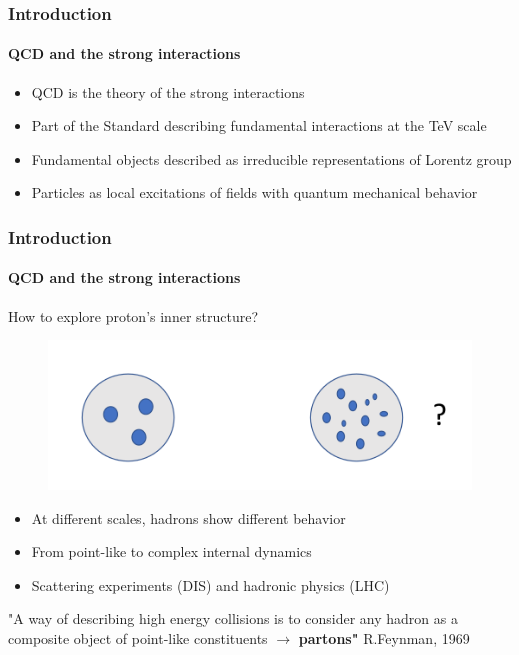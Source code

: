 \documentclass[aspectratio=43]{beamer}
\begin{document}
\begin{frame}

	\frametitle{Introduction}
	\framesubtitle{QCD and the strong interactions}
	
	\footnotesize
	
	\begin{itemize}
		\item QCD is the theory of the strong interactions
		\item Part of the Standard describing fundamental interactions at the TeV scale
		\item Fundamental objects described as irreducible representations of Lorentz group
		\item Particles as local excitations of fields with quantum mechanical behavior
	\end{itemize}

\end{frame}

\begin{frame}

	\frametitle{Introduction}
	\framesubtitle{QCD and the strong interactions}
	
	\footnotesize
	
	How to explore proton's inner structure?

	\begin{figure}
		\includegraphics[width = 0.5\linewidth]{plots/part1/intro/protons.png}
	\end{figure}
	
	
	\begin{itemize}
		\item At different scales, hadrons show different behavior
		\item From point-like to complex internal dynamics
		\item Scattering experiments (DIS) and hadronic physics (LHC)
	\end{itemize}
	
	{\color{blue} \footnotesize "A way of describing high energy collisions is to consider any hadron as a composite object of point-like constituents $\longrightarrow$ \textbf{partons"} } R.Feynman, 1969 

\end{frame}
\end{document}
